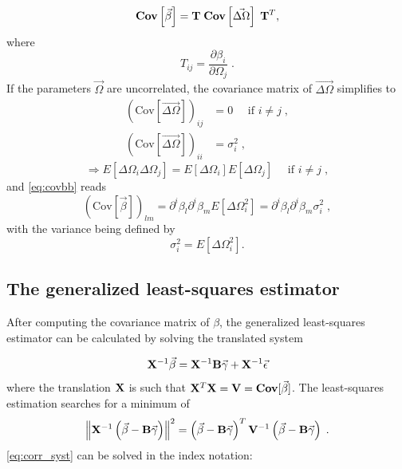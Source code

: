 \begin{equation}\label{key}
\mathbf{Cov}\left[\vec{\beta}\right] = \mathbf{T}\; \mathbf{Cov}\left[\vec{\Delta\Omega}\right] \;\mathbf{T}^T,
\end{equation} where 
\begin{equation}\label{key}
T_{ij} = \frac{\partial \beta_i}{\partial \Omega_j}\;.
\end{equation}
If the parameters $ \vec{\Omega} $ are uncorrelated, the covariance matrix of $\vec{ \Delta\Omega} $ simplifies to
\begin{align}\label{key}
\left(\text{Cov}\left[\vec{\Delta\Omega}\right] \right)_{ij}&= 0 \quad  \text{ if } i\neq j \;,\\
 \left(\text{Cov}\left[\vec{\Delta\Omega}\right] \right)_{ii}&= \sigma_i^2\;,
\end{align} 
\begin{equation}\label{key}
\Rightarrow E\left[\Delta\Omega_i\Delta\Omega_j\right] = E\left[\Delta\Omega_i\right]E\left[\Delta\Omega_j\right]\quad \text{ if } i \neq j\;,
\end{equation}
and \eqref{eq:covbb} reads
\begin{equation}\label{key}
(\text{Cov}[\vec{\beta}])_{lm} = \partial^i\beta_l\partial^i\beta_mE[\Delta\Omega_i^2] = \partial^i\beta_l\partial^i\beta_m \sigma_i^2\;,
\end{equation}
with the variance being defined by
\begin{equation}\label{key}
\sigma_i^2 = E\left[\Delta\Omega_i^2\right].
\end{equation}

\subsection{The generalized least-squares estimator}

After computing the covariance matrix of $ \beta $, the generalized least-squares estimator can be calculated
by solving the translated system

\begin{equation}
\mathbf{X}^{-1} \vec{\beta} = \mathbf{X}^{-1}\mathbf{B}\vec{\gamma} + \mathbf{X}^{-1}\vec{\epsilon}
\end{equation}
where the translation $ \mathbf{X} $ is such that $ \mathbf{X}^T\mathbf{X} = \mathbf{V} = \mathbf{Cov}[\vec{\beta}] $. The least-squares estimation searches for a minimum of 
\begin{equation}
\left\|\mathbf{X}^{-1}\left(\vec{\beta} - \mathbf{B}\vec{\gamma}\right)\right\|^2 = \left(\vec{\beta} - \mathbf{B}\vec{\gamma}\right)^T \mathbf{V}^{-1}\left(\vec{\beta} - \mathbf{B}\vec{\gamma}\right)\;.
\label{eq:corr_syst}
\end{equation} %
\eqref{eq:corr_syst} can be solved in the index notation:

